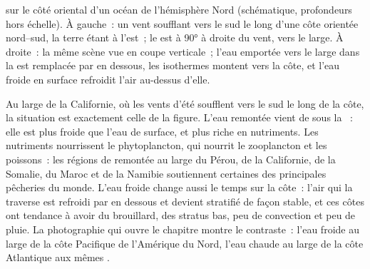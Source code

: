 \begin{omfigure}

{\small {} sur le côté oriental d'un océan de l'hémisphère
Nord (schématique, profondeurs hors échelle). À gauche~: un vent soufflant vers le sud
le long d'une côte orientée nord--sud, la terre étant à l'est~; le  est à \ang{90} à droite du vent, vers le large. À droite~: la même scène vue en
coupe verticale~; l'eau emportée vers le large dans la  est remplacée par
en dessous, les isothermes montent vers la côte, et l'eau froide en surface refroidit
l'air au-dessus d'elle.}
\label{fig:b1:ocean-circulation:upwelling}
\end{omfigure}

Au large de la Californie, où les vents d'été soufflent vers le sud le long de la côte,
la situation est exactement celle de la figure. L'eau
remontée vient de sous la ~: elle est plus froide que l'eau de surface, et
plus riche en nutriments. Les nutriments nourrissent le phytoplancton, qui nourrit le
zooplancton et les poissons~: les régions de remontée au large du Pérou, de la Californie, de la Somalie,
du Maroc et de la Namibie soutiennent certaines des principales pêcheries du monde. L'eau froide
change aussi le temps sur la côte~: l'air qui la traverse est refroidi par en dessous et
devient stratifié de façon stable, et ces côtes ont tendance à avoir du brouillard, des stratus bas,
peu de convection et peu de pluie. La photographie qui ouvre le chapitre montre le
contraste~: l'eau froide au large de la côte Pacifique de l'Amérique du Nord, l'eau chaude au large de
la côte Atlantique aux mêmes .

